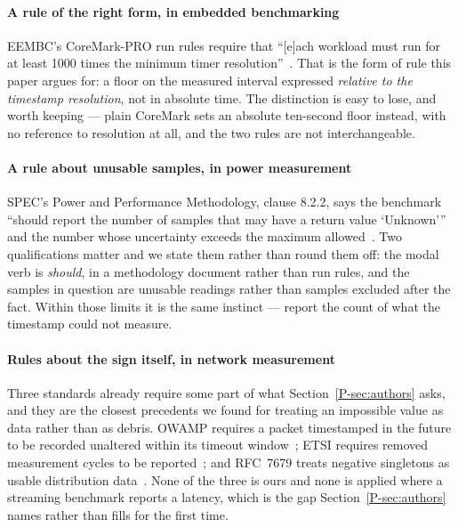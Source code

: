 \documentclass[10pt,journal,onecolumn]{IEEEtran}
\newcommand{\mainAuthors}{\ref{P-sec:authors}}        %
\begin{document}
\paragraph{A rule of the right form, in embedded benchmarking}
EEMBC's CoreMark-PRO run rules require that ``[e]ach workload must run for at least 1000 times
the minimum timer resolution''~\cite{coremark_pro}. That is the form of rule this paper argues
for: a floor on the measured interval expressed \emph{relative to the timestamp resolution}, not in
absolute time. The distinction is easy to lose, and worth keeping --- plain CoreMark sets an
absolute ten-second floor instead, with no reference to resolution at all, and the two rules
are not interchangeable.

\paragraph{A rule about unusable samples, in power measurement}
SPEC's Power and Performance Methodology, clause 8.2.2, says the benchmark ``should report the
number of samples that may have a return value `Unknown''' and the number whose uncertainty
exceeds the maximum allowed~\cite{specpower_method}. Two qualifications matter and we state
them rather than round them off: the modal verb is \emph{should}, in a methodology document
rather than run rules, and the samples in question are unusable readings rather than samples
excluded after the fact. Within those limits it is the same instinct --- report the count of
what the timestamp could not measure.

\paragraph{Rules about the sign itself, in network measurement}
Three standards already require some part of what Section~\mainAuthors{} asks, and they are the closest
precedents we found for treating an impossible value as data rather than as debris. OWAMP
requires a packet timestamped in the future to be recorded unaltered within its timeout
window~\cite{rfc4656}; ETSI requires removed measurement cycles to be
reported~\cite[Clause~5.1]{etsi102250}; and RFC~7679 treats negative singletons as usable
distribution data~\cite[Sec.~3.5]{rfc7679}. None of the three is ours and none is applied where a streaming benchmark
reports a latency, which is the gap Section~\mainAuthors{} names rather than fills for the first time.
\end{document}
